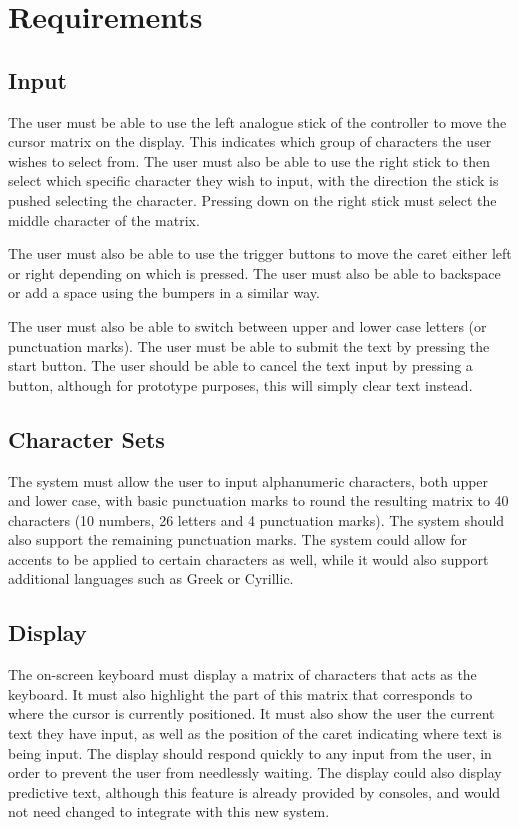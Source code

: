 \documentclass[requirements.tex]{subfiles}
\begin{document}
\section{Requirements} %
\label{sec:requirements}

\subsection{Input} %
\label{sub:input}
The user must be able to use the left analogue stick of the controller to move
the cursor matrix on the display. This indicates which group of characters the
user wishes to select from. The user must also be able to use the right stick to
then select which specific character they wish to input, with the direction the
stick is pushed selecting the character. Pressing down on the right stick must
select the middle character of the matrix.

The user must also be able to use the trigger buttons to move the caret either
left or right depending on which is pressed. The user must also be able to
backspace or add a space using the bumpers in a similar way.

The user must also be able to switch between upper and lower case letters (or
punctuation marks). The user must be able to submit the text by pressing the
start button. The user should be able to cancel the text input by pressing a
button, although for prototype purposes, this will simply clear text instead.

\subsection{Character Sets} %
\label{sub:character_sets}
The system must allow the user to input alphanumeric characters, both upper and
lower case, with basic punctuation marks to round the resulting matrix to 40
characters (10 numbers, 26 letters and 4 punctuation marks). The system should
also support the remaining punctuation marks. The system could allow for accents
to be applied to certain characters as well, while it would also support
additional languages such as Greek or Cyrillic.

\subsection{Display} %
\label{sub:display}
The on-screen keyboard must display a matrix of characters that acts as the
keyboard. It must also highlight the part of this matrix that corresponds to
where the cursor is currently positioned. It must also show the user the current
text they have input, as well as the position of the caret indicating where text
is being input. The display should respond quickly to any input from the user,
in order to prevent the user from needlessly waiting. The display could also
display predictive text, although this feature is already provided by consoles,
and would not need changed to integrate with this new system.
\end{document}
